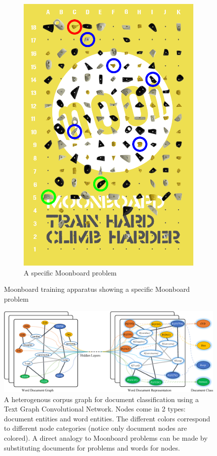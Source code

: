 \documentclass{article}
\begin{document}
\begin{figure}
\begin{subfigure}{.48\textwidth}
  \includegraphics[width=.8\linewidth]{moonboard_1}
  \caption{A specific Moonboard problem}
  \label{fig: Moonboard Problem}
\end{subfigure}
\caption{Moonboard training apparatus showing a specific Moonboard problem}
\end{figure}

\begin{figure}
\centering
\includegraphics[width=.8\linewidth]{textGCN}
\caption{A heterogenous corpus graph for document classification using a Text Graph Convolutional Network. Nodes come in 2 types: document entities and word entities. The different colors correspond to different node categories (notice only document nodes are colored). A direct analogy to Moonboard problems can be made by substituting documents for problems and words for nodes.}
\label{fig: Corpus graph for Text Graph Convolutional Network}
\end{figure}
\end{document}
